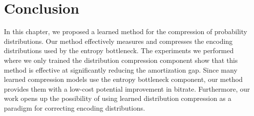 



%
%

\FloatBarrier




\section{Conclusion}
\label{sec:pdf_compression/conclusion}

In this chapter, we proposed a learned method for the compression of probability distributions.
Our method effectively measures and compresses the encoding distributions used by the entropy bottleneck.
The experiments we performed where we only trained the distribution compression component show that this method is effective at significantly reducing the amortization gap.
Since many learned compression models use the entropy bottleneck component, our method provides them with a low-cost potential improvement in bitrate.
Furthermore, our work opens up the possibility of using learned distribution compression as a paradigm for correcting encoding distributions.



%
%
%
%




